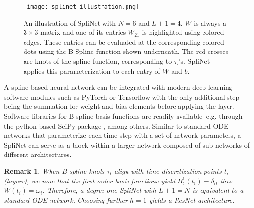 \documentclass[12pt]{amsart}
\newtheorem{remark}{Remark}
\begin{document}
\begin{figure}
  \centering
  \texttt{[image: splinet\_illustration.png]}
  \caption{An illustration of SpliNet with $N=6$ and $L+1 = 4$. $W$ is always a $3\times 3$ matrix and one of its entries $W_{21}^{ }$ is highlighted using colored edges. These entries can be evaluated at the corresponding colored dots using the B-Spline function shown underneath. The red crosses are knots of the spline function, corresponding to $\tau_l$'s. SpliNet applies this parameterization to each entry of $W$ and $b$.}
  \label{fig:splinet}
\end{figure}


A spline-based neural network can be integrated with modern deep learning software modules such as PyTorch \cite{NEURIPS2019_9015} or Tensorflow \cite{tensorflow2015-whitepaper} with the only additional step being the summation for weight and bias elements before applying the layer. Software libraries for B-spline basis functions are readily available, e.g. through the python-based SciPy package \cite{2020SciPy-NMeth}, among others.
Similar to standard ODE networks that parameterize each time step with a set of network parameters, a SpliNet can serve as a block within a larger network composed of sub-networks of different architectures.


\begin{remark}
    When B-spline knots $\tau_l$ align with time-discretization points $t_i$ (layers), we note that the first-order basis functions yield $B^1_l(t_i) = \delta_{li}$ thus $W(t_i) = \omega_i$.
    Therefore, a degree-one SpliNet with $L+1 = N$ is equivalent to a standard ODE network. Choosing further $h=1$ yields a ResNet architecture.
\end{remark}
\end{document}
